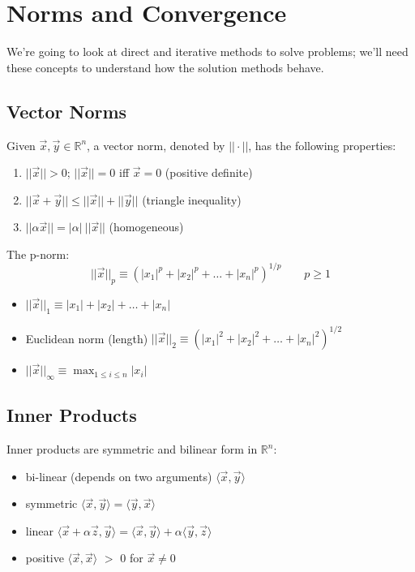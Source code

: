 \documentclass[12pt]{article}
\begin{document}
\section*{Norms and Convergence}
We're going to look at direct and iterative methods to solve problems; we'll need these concepts to understand how the solution methods behave.

\subsection*{Vector Norms}
Given $\vec{x}, \vec{y} \in \mathbb{R}^n$, a vector norm, denoted by $|| \cdot ||$, has the following properties:
%
\begin{enumerate}
\item $||\vec{x}|| > 0$; $||\vec{x}|| = 0$ iff $\vec{x} = 0$ (positive definite)
\item $||\vec{x} + \vec{y}|| \leq ||\vec{x}|| + ||\vec{y}||$ (triangle inequality)
\item $||\alpha \vec{x}|| = |\alpha|\: ||\vec{x}||$ (homogeneous)
\end{enumerate}

The p-norm:
%
\begin{equation}
||\vec{x}||_p \equiv (|x_1|^p + |x_2|^p + \dots + |x_n|^p)^{1/p} \qquad p \geq 1 \nonumber
\end{equation}
%
\begin{itemize}
\item $||\vec{x}||_1 \equiv |x_1| + |x_2| + \dots + |x_n|$
\item Euclidean norm (length) $||\vec{x}||_2 \equiv (|x_1|^2 + |x_2|^2 + \dots + |x_n|^2)^{1/2}$
\item $||\vec{x}||_{\infty} \equiv \displaystyle \max_{1 \leq i \leq n} |x_i|$
\end{itemize}

\subsection*{Inner Products}
Inner products are symmetric and bilinear form in $\mathbb{R}^n$:
%
\begin{itemize}
\item bi-linear (depends on two arguments) $\langle \vec{x}, \vec{y} \rangle$
\item symmetric $\langle \vec{x}, \vec{y} \rangle = \langle \vec{y}, \vec{x} \rangle$
\item linear $\langle \vec{x} + \alpha \vec{z}, \vec{y} \rangle = \langle \vec{x}, \vec{y} \rangle + \alpha \langle \vec{y}, \vec{z} \rangle$
\item positive $\langle \vec{x}, \vec{x} \rangle$ $>$ 0 for $\vec{x} \neq 0$
\end{itemize}
\end{document}
